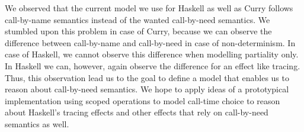 We observed that the current model we use for Haskell as well as Curry follows call\--by\--name semantics instead of the wanted call\--by\--need semantics.
We stumbled upon this problem in case of Curry, because we can observe the difference between call\--by\--name and call\--by\--need in case of non\--determinism.
In case of Haskell, we cannot observe this difference when modelling partiality only.
In Haskell we can, however, again observe the difference for an effect like tracing.
Thus, this observation lead us to the goal to define a model that enables us to reason about call\--by\--need semantics.
We hope to apply ideas of a prototypical implementation using scoped operations to model call\--time choice to reason about Haskell's tracing effects and other effects that rely on call\--by\--need semantics as well.
